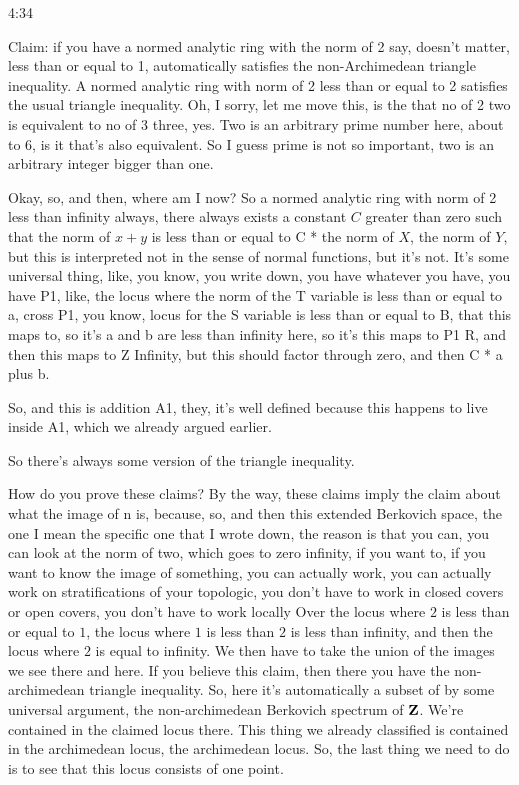 \begin{unfinished}{4:34}
\begin{example}
Claim: if you have a normed analytic ring with the norm of 2 say, doesn't matter, less than or equal to 1, automatically satisfies the non-Archimedean triangle inequality. A normed analytic ring with norm of 2 less than or equal to 2 satisfies the usual triangle inequality. Oh, I sorry, let me move this, is the that no of 2 two is equivalent to no of 3 three, yes. Two is an arbitrary prime number here, about to 6, is it that's also equivalent. So I guess prime is not so important, two is an arbitrary integer bigger than one.

Okay, so, and then, where am I now? So a normed analytic ring with norm of 2 less than infinity always, there always exists a constant $C$ greater than zero such that the norm of $x + y$ is less than or equal to C * the norm of $X$, the norm of $Y$, but this is interpreted not in the sense of normal functions, but it's not. It's some universal thing, like, you know, you write down, you have whatever you have, you have P1, like, the locus where the norm of the T variable is less than or equal to a, cross P1, you know, locus for the S variable is less than or equal to B, that this maps to, so it's a and b are less than infinity here, so it's this maps to P1 R, and then this maps to Z Infinity, but this should factor through zero, and then C * a plus b.

So, and this is addition A1, they, it's well defined because this happens to live inside A1, which we already argued earlier.

So there's always some version of the triangle inequality.

How do you prove these claims? By the way, these claims imply the claim about what the image of n is, because, so, and then this extended Berkovich space, the one I mean the specific one that I wrote down, the reason is that you can, you can look at the norm of two, which goes to zero infinity, if you want to, if you want to know the image of something, you can actually work, you can actually work on stratifications of your topologic, you don't have to work in closed covers or open covers, you don't have to work locally
Over the locus where $2$ is less than or equal to $1$, the locus where $1$ is less than $2$ is less than infinity, and then the locus where $2$ is equal to infinity. We then have to take the union of the images we see there and here. If you believe this claim, then there you have the non-archimedean triangle inequality. So, here it's automatically a subset of by some universal argument, the non-archimedean Berkovich spectrum of $\mathbf Z$. We're contained in the claimed locus there. This thing we already classified is contained in the archimedean locus, the archimedean locus. So, the last thing we need to do is to see that this locus consists of one point.


\end{example}
\end{unfinished}
